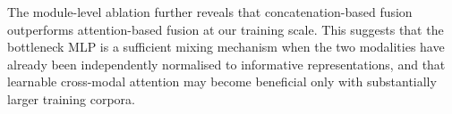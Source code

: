 The module-level ablation further reveals that concatenation-based
fusion outperforms attention-based fusion at our training scale.  This
suggests that the bottleneck MLP is a sufficient mixing mechanism when
the two modalities have already been independently normalised to
informative representations, and that learnable cross-modal attention
may become beneficial only with substantially larger training corpora.
